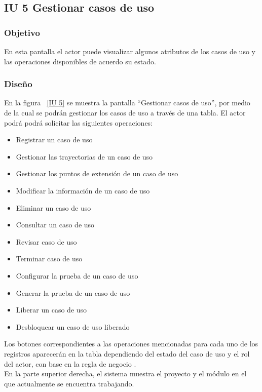 \newpage 
\subsection{IU 5 Gestionar casos de uso}
\subsubsection{Objetivo}
	
	En esta pantalla el actor puede visualizar algunos atributos de los casos de uso y las operaciones disponibles de acuerdo su estado.

\subsubsection{Diseño}

    En la figura ~\ref{IU 5} se muestra la pantalla ``Gestionar casos de uso'', por medio de la cual 
    se podrán gestionar los casos de uso a través de una tabla.
    El actor podrá podrá solicitar las siguientes operaciones:
	
	\begin{itemize}
		\item Registrar un caso de uso
		\item Gestionar las trayectorias de un caso de uso
		\item Gestionar los puntos de extensión de un caso de uso
		\item Modificar la información de un caso de uso
		\item Eliminar un caso de uso
		\item Consultar un caso de uso
		\item Revisar caso de uso
		\item Terminar caso de uso
		\item Configurar la prueba de un caso de uso
		\item Generar la prueba de un caso de uso
		\item Liberar un caso de uso
		\item Desbloquear un caso de uso liberado
	\end{itemize}
    
    Los botones correspondientes a las operaciones mencionadas para cada uno de los registros aparecerán en la tabla dependiendo del estado
    del caso de uso y el rol del actor, con base en la regla de negocio .\\
	
	En la parte superior derecha, el sistema muestra el proyecto y el módulo en el que actualmente se encuentra trabajando.


